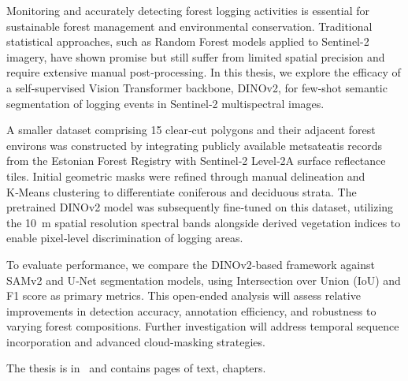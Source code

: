 Monitoring and accurately detecting forest logging activities is essential for sustainable forest management and environmental conservation. Traditional statistical approaches, such as Random Forest models applied to Sentinel-2 imagery, have shown promise but still suffer from limited spatial precision and require extensive manual post‑processing. In this thesis, we explore the efficacy of a self‑supervised Vision Transformer backbone, DINOv2, for few‑shot semantic segmentation of logging events in Sentinel‑2 multispectral images.

A smaller dataset comprising 15 clear‑cut polygons and their adjacent forest environs was constructed by integrating publicly available metsateatis records from the Estonian Forest Registry with Sentinel‑2 Level‑2A surface reflectance tiles. Initial geometric masks were refined through manual delineation and K‑Means clustering to differentiate coniferous and deciduous strata. The pretrained DINOv2 model was subsequently fine‑tuned on this dataset, utilizing the 10 m spatial resolution spectral bands alongside derived vegetation indices to enable pixel‑level discrimination of logging areas.

To evaluate performance, we compare the DINOv2‑based framework against SAMv2 and U‑Net segmentation models, using Intersection over Union (IoU) and F1 score as primary metrics. This open-ended analysis will assess relative improvements in detection accuracy, annotation efficiency, and robustness to varying forest compositions. Further investigation will address temporal sequence incorporation and advanced cloud‑masking strategies.


The thesis is in \langEng~and contains \calculatepages pages of text, 
 chapters.

